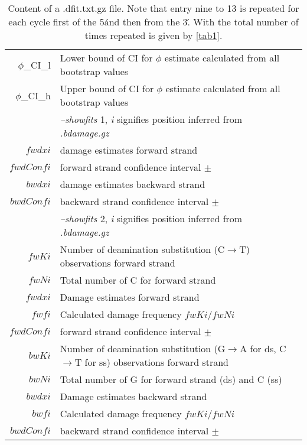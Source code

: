 \documentclass[10pt]{article}
\begin{document}
\begin{table}[h]
\begin{tabular}{rll}
  {\sf $\phi$\_CI\_l} & Lower bound of CI for $\phi$ estimate calculated from all bootstrap values \\
  {\sf $\phi$\_CI\_h} & Upper bound of CI for $\phi$ estimate calculated from all bootstrap values \\ \hline
  {\sf } & \textit{--showfits} 1, \textit{i} signifies position inferred from \textit{.bdamage.gz}\\ \hline  
  {\sf $fwdxi$} & damage estimates forward strand \\
  {\sf $fwdConfi$} & forward strand confidence interval $\pm$\\
  {\sf $bwdxi$} & damage estimates backward strand\\
  {\sf $bwdConfi$} & backward strand confidence interval $\pm$\\ \hline
  {\sf } & \textit{--showfits} 2, \textit{i} signifies position inferred from \textit{.bdamage.gz} \\ \hline  
  {\sf $fwKi$} & Number of deamination substitution (C$\rightarrow$T) observations forward strand \\
  {\sf $fwNi$} & Total number of  C for forward strand\\
  {\sf $fwdxi$} & Damage estimates forward strand \\
  {\sf $fwfi$} & Calculated damage frequency $fwKi$/$fwNi$\\
  {\sf $fwdConfi$} & forward strand confidence interval $\pm$\\
  {\sf $bwKi$} & Number of deamination substitution (G$\rightarrow$A for ds, C$\rightarrow$T for ss) observations forward strand \\
  {\sf $bwNi$} & Total number of G for forward strand (ds) and C (ss)\\
  {\sf $bwdxi$} & Damage estimates backward strand \\
  {\sf $bwfi$} & Calculated damage frequency $fwKi$/$fwNi$\\
  {\sf $bwdConfi$} & backward strand confidence interval $\pm$\\ \hline
\end{tabular}\label{tab4}
\caption{Content of a .dfit.txt.gz file. Note that entry nine to 13 is
  repeated for each cycle first of the 5\' and then from the 3\'. With
  the total number of times repeated is given by \ref{tab1}.} 
\end{table}
\end{document}
